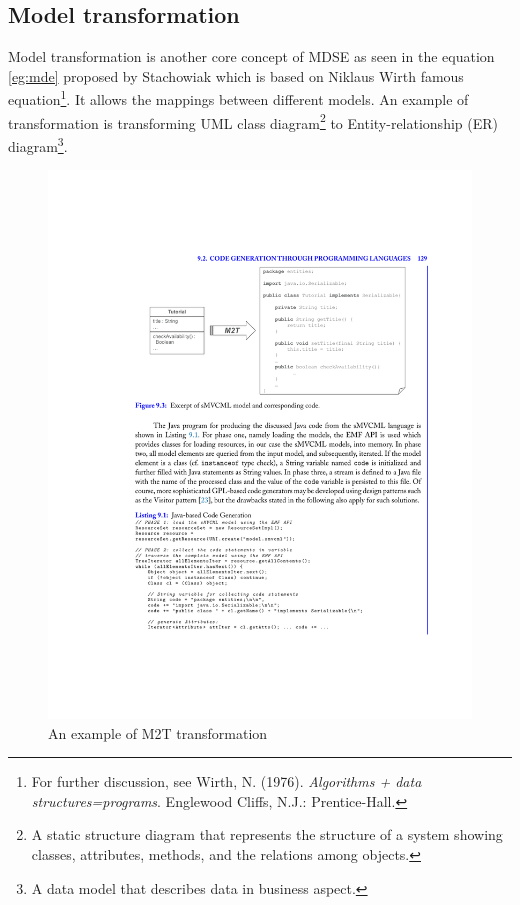 \subsection{Model transformation}
Model transformation is another core concept of MDSE as seen in the equation \ref{eg:mde} proposed by Stachowiak which is based on Niklaus Wirth famous equation\footnote{For further discussion, see Wirth, N. (1976). \textit{Algorithms + data structures=programs}. Englewood Cliffs, N.J.: Prentice-Hall.}. It allows the mappings between different models. An example of transformation is transforming UML class diagram\footnote{A static structure diagram that represents the structure of a system showing classes, attributes, methods, and the relations among objects.} to Entity-relationship (ER) diagram\footnote{A data model that describes data in business aspect.}.

\begin{figure}[H]
\centering
\captionsetup{justification=centering}
\vspace{0cm}%
\includegraphics[width=0.8\linewidth]{figure/literatures/brambilla_m2t_example.pdf}
\caption{An example of M2T transformation~\cite{Brambilla}}
\label{fig:brambilla-m2t}
\end{figure}

